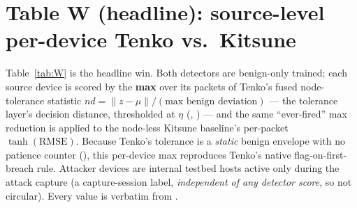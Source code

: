 \documentclass[11pt]{article}
\begin{document}
\section{Table W (headline): source-level per-device Tenko vs.\ Kitsune}
\label{sec:headline}

Table~\ref{tab:W} is the headline win. Both detectors are benign-only trained; each source device is
scored by the \textbf{max} over its packets of Tenko's fused node-tolerance statistic
$nd=\lVert z-\mu\rVert/(\text{max benign deviation})$ --- the tolerance layer's decision distance,
thresholded at $\eta$ (, ) --- and the same
``ever-fired'' max reduction is applied to the node-less Kitsune baseline's per-packet
$\tanh(\mathrm{RMSE})$. Because Tenko's tolerance is a \emph{static} benign envelope with no patience
counter (), this per-device max reproduces Tenko's native
flag-on-first-breach rule. Attacker devices are internal testbed hosts active only during the attack
capture (a capture-session label, \emph{independent of any detector score}, so not circular). Every
value is verbatim from .
\end{document}
